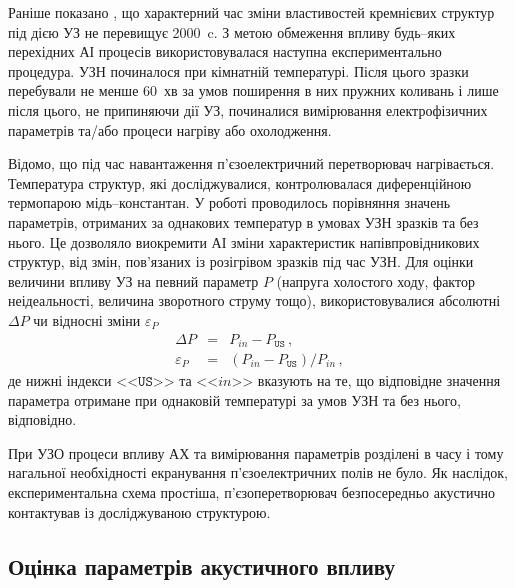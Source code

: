 Раніше показано \cite{Ostapenko1995,YOlikhTPL2011,Ostrovskii2001}, що характерний час зміни властивостей кремнієвих структур під дією УЗ не перевищує 2000~c.
З метою обмеження впливу будь--яких перехідних АІ процесів використовувалася наступна експериментально процедура.
УЗН починалося при кімнатній температурі.
Після цього зразки перебували не менше 60~хв за умов поширення в них пружних коливань і лише після цього, не припиняючи дії УЗ, починалися вимірювання електрофізичних параметрів та/або процеси нагріву або охолодження.


Відомо, що під час навантаження п'єзоелектричний перетворювач нагрівається.
Температура структур, які досліджувалися, контролювалася диференційною термопарою мідь--константан.
У роботі проводилось порівняння значень параметрів, отриманих за однакових температур в умовах УЗН зразків та без нього.
Це дозволяло виокремити АІ зміни характеристик напівпровідникових структур, від змін, пов'язаних із розігрівом зразків під час УЗН.
Для оцінки величини впливу УЗ на певний параметр $P$ (напруга холостого ходу, фактор неідеальності, величина зворотного струму тощо),
використовувалися абсолютні
$\Delta P$ чи відносні зміни $\varepsilon_P$
\begin{eqnarray}
  \label{eqAbsDelta} \Delta P &=& P_{in}-P_\mathtt{US}\,, \\
  \label{eqEpsDelta} \varepsilon_P &=& (P_{in}-P_\mathtt{US})/P_{in}\,,
\end{eqnarray}
де нижні індекси <<$\mathtt{US}$>> та <<$in$>> вказують на те, що відповідне значення параметра отримане при однаковій температурі за умов УЗН та без нього, відповідно.

При УЗО процеси впливу АХ та вимірювання параметрів розділені в часу і тому нагальної необхідності екранування п'єзоелектричних полів не було.
Як наслідок, експериментальна схема простіша, п'єзоперетворювач безпосередньо акустично контактував із досліджуваною структурою.


\subsection{Оцінка параметрів акустичного впливу\label{SC:USL}}


